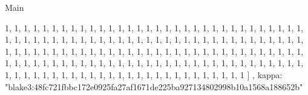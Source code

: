 \begin{lexlean}{Main}
\begin{semanticmodule}
{{      1,
      1,
      1,
      1,
      1,
      1,
      1,
      1,
      1,
      1,
      1,
      1,
      1,
      1,
      1,
      1,
      1,
      1,
      1,
      1,
      1,
      1,
      1,
      1,
      1,
      1,
      1,
      1,
      1,
      1,
      1,
      1,
      1,
      1,
      1,
      1,
      1,
      1,
      1,
      1,
      1,
      1,
      1,
      1,
      1,
      1,
      1,
      1,
      1,
      1,
      1,
      1,
      1,
      1,
      1,
      1,
      1,
      1,
      1,
      1,
      1,
      1,
      1,
      1,
      1,
      1,
      1,
      1,
      1,
      1,
      1,
      1,
      1,
      1,
      1,
      1,
      1,
      1,
      1,
      1,
      1,
      1,
      1,
      1,
      1,
      1,
      1,
      1,
      1,
      1,
      1,
      1,
      1,
      1,
      1,
      1,
      1,
      1,
      1,
      1,
      1,
      1,
      1,
      1,
      1,
      1,
      1,
      1,
      1,
      1,
      1,
      1,
      1,
      1,
      1,
      1,
      1,
      1,
      1,
      1,
      1,
      1,
      1,
      1,
      1,
      1,
      1,
      1,
      1,
      1,
      1,
      1,
      1,
      1,
      1,
      1,
      1,
      1,
      1,
      1,
      1,
      1,
      1,
      1,
      1,
      1,
      1,
      1,
      1,
      1,
      1,
      1,
      1,
      1
    ]
  },
  kappa: "blake3:48fc721fbbc172e0925fa27af1671de225ba927134802998b10a1568a188652b"
}
\end{semanticmodule}
\end{lexlean}
